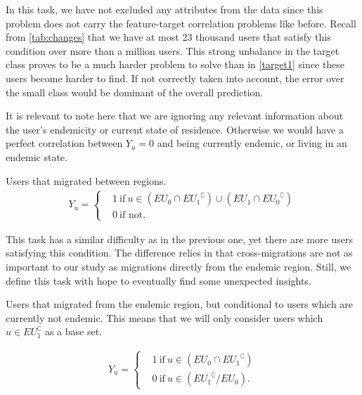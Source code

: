 In this task, we have not excluded any attributes from the data since this problem does not carry the feature-target correlation problems like before.
Recall from \cref{tab:changes} that we have at most 23 thousand users that satisfy this condition over more than a million users.
This strong unbalance in the target class proves to be a much harder problem to solve than in \cref{target1} since these users become harder to find.
If not correctly taken into account, the error over the small class would be dominant of the overall prediction.

It is relevant to note here that we are ignoring any relevant information about the user's endemicity or current state of residence.
Otherwise we would have a perfect correlation between $Y_u=0$ and being currently endemic, or living in an endemic state.



\begin{problem}\label{target3}
Users that migrated between regions.
\begin{align*}
			Y_u =
			\begin{cases}
				&1 \ \mbox{if} \ u \in (EU_{0} \cap { EU_{1} }^{\complement}) \cup (EU_{1} \cap { EU_{0} }^{\complement}) \\
				&0 \ \mbox{if not}.
			\end{cases}
		\end{align*}
\end{problem}

This task has a similar difficulty as in the previous one, yet there are more users satisfying this condition.
The difference relies in that cross-migrations are not as important to our study as migrations directly from the endemic region.
Still, we define this task with hope to eventually find some unexpected insights.


\begin{problem}\label{target4}
Users that migrated from the endemic region, but conditional to users which are currently not endemic.
This means that we will only consider users which $u \in EU_{1}^{\complement}$ as a base set.

\begin{align*}
			Y_u =
			\begin{cases}
				& 1 \ \mbox{if} \ u \in ( EU_{0} \cap { EU_{1} }^{\complement})    \\
				& 0 \ \mbox{if} \ u \in ( { EU_{1} }^{\complement} / EU_{0}).
			\end{cases}
		\end{align*}
\end{problem}

